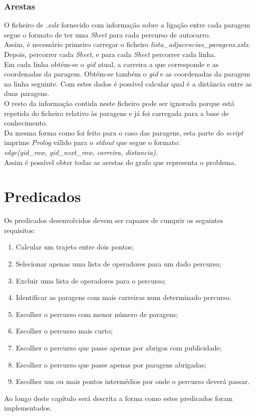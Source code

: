 \documentclass[a4paper]{report}
\begin{document}
\subsection{Arestas}
O ficheiro de \textit{.xslx} fornecido com informação sobre a ligação entre cada
paragem segue o formato de ter uma \textit{Sheet} para cada percurso de
autocarro.\\
Assim, é necessário primeiro carregar o ficheiro
\textit{lista\_adjacencias\_paragens.xslx}. Depois, percorrer cada
\textit{Sheet}, e para cada \textit{Sheet} percorrer cada linha.\\
Em cada linha obtém-se o \textit{gid} atual, a carreira a que corresponde e as
coordenadas da paragem. Obtém-se também o \textit{gid} e as coordenadas da
paragem na linha seguinte. Com estes dados é possível calcular qual é a
distância entre as duas paragens.\\
O resto da informação contida neste ficheiro pode ser ignorada porque está
repetida do ficheiro relativo às paragens e já foi carregada para a base de
conhecimento.\\
Da mesma forma como foi feito para o caso das paragens, esta parte do
\textit{script} imprime \textit{Prolog} válido para o \textit{stdout} que
segue o formato:\\
\textit{edge(gid\_row, gid\_next\_row, carreira, distancia).}\\
Assim é possível obter todas as arestas do grafo que representa o problema.\\

\chapter{Predicados}
Os predicados desenvolvidos devem ser capazes de cumprir os seguintes
requisitos:

\begin{enumerate}
    \item Calcular um trajeto entre dois pontos;
    \item Selecionar apenas uma lista de operadores para um dado percurso;
    \item Excluir uma lista de operadores para o percurso;
    \item Identificar as paragens com mais carreiras num determinado percurso.
    \item Escolher o percurso com menor número de paragens;
    \item Escolher o percurso mais curto;
    \item Escolher o percurso que passe apenas por abrigos com publicidade;
    \item Escolher o percurso que passe apenas por paragens abrigadas;
    \item Escolher um ou mais pontos intermédios por onde o percurso deverá passar.
\end{enumerate}
Ao longo deste capítulo será descrita a forma como estes predicados foram
implementados.
\end{document}
